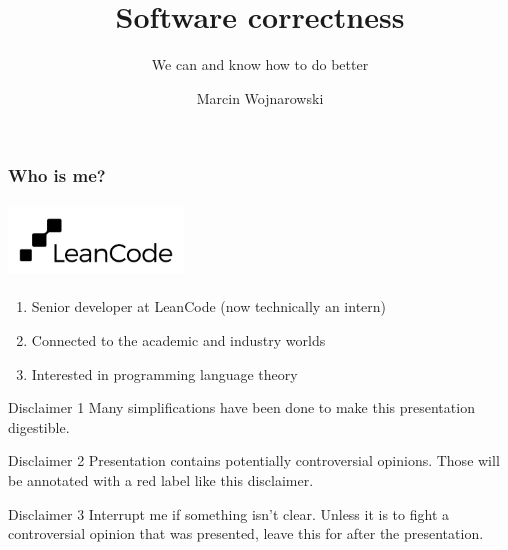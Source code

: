 \documentclass[compress,12pt,xcolor={dvipsnames}]{beamer}
\title{Software correctness}
\subtitle{We can and know how to do better}
\date{}
\author{Marcin Wojnarowski \emojicamel}
\institute{Fluttercon 2024}
\begin{document}


\begin{frame}
    \frametitle{Who is me?}
    \framesubtitle{\includegraphics[width=0.35\textwidth]{leancode_logo.png}}

    \begin{enumerate}
        \item Senior developer at LeanCode (now technically an intern)
        \item Connected to the academic and industry worlds
        \item Interested in programming language theory
    \end{enumerate}
\end{frame}


\begin{frame}
    \begin{block}{Disclaimer 1}
        Many simplifications have been done to make this presentation digestible.
    \end{block}
    \begin{alertblock}{Disclaimer 2}
        Presentation contains potentially controversial opinions. Those will be annotated with a red label like this disclaimer.
    \end{alertblock}
    \begin{block}{Disclaimer 3}
        Interrupt me if something isn't clear. Unless it is to fight a controversial opinion that was presented, leave this for after the presentation.
    \end{block}
\end{frame}
\end{document}
